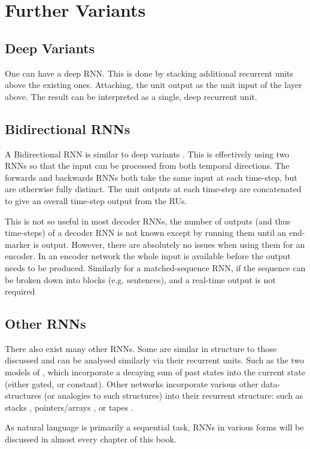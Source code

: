 \documentclass[12pt,parskip]{komatufte}
\begin{document}
\section{Further Variants}
\subsection{Deep Variants}
One can have a deep RNN.
This is done by stacking additional recurrent units above the existing ones.
Attaching, the unit output as the unit input of the layer above.
The result can be interpreted as a single, deep recurrent unit.

\subsection{Bidirectional RNNs}\label{sec:bidirection-rnns}
A Bidirectional RNN is similar to deep variants .
This is effectively using two RNNs so that the input can be processed from both temporal directions.
The forwards and backwards RNNs both take the same input at each time-step, but are otherwise fully distinct.
The unit outputs at each time-step are concatenated to give an overall time-step output from the RUs.

This is not so useful in most decoder RNNs, the number of outputs (and thus time-steps) of a decoder RNN is not known except by running them until an end-marker is output.
However, there are absolutely no issues when using them for an encoder.
In an encoder network the whole input is available before the output needs to be produced.
Similarly for a matched-sequence RNN, if  the sequence can be broken down into blocks (e.g. sentences), and a real-time output is not required


\subsection{Other RNNs}
There also exist many other RNNs.
Some are similar in structure to those discussed and can be analysed similarly via their recurrent units.
Such as the two models of , which incorporate a decaying sum of past states into the current state (either gated, or constant).
Other networks incorporate various other data-structures (or analogies to such structures) into their recurrent structure:
such as stacks , pointers/arrays , or tapes .

As natural language is primarily a sequential task, RNNs in various forms will be discussed in almost every chapter of this book.

\end{document}
